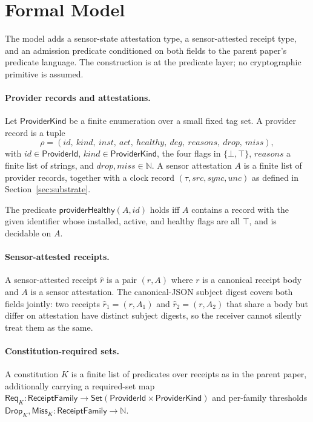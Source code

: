 \section{Formal Model}
\label{sec:model}

The model adds a sensor-state attestation type, a sensor-attested receipt type, and an admission predicate conditioned on both fields to the parent paper's predicate language. The construction is at the predicate layer; no cryptographic primitive is assumed.

\paragraph{Provider records and attestations.}
Let $\mathsf{ProviderKind}$ be a finite enumeration over a small fixed tag set. A provider record is a tuple
\[
  \rho = (\mathit{id},\ \mathit{kind},\ \mathit{inst},\ \mathit{act},\ \mathit{healthy},\ \mathit{deg},\ \mathit{reasons},\ \mathit{drop},\ \mathit{miss}),
\]
with $\mathit{id} \in \mathsf{ProviderId}$, $\mathit{kind} \in \mathsf{ProviderKind}$, the four flags in $\{\bot,\top\}$, $\mathit{reasons}$ a finite list of strings, and $\mathit{drop}, \mathit{miss} \in \mathbb{N}$. A sensor attestation $A$ is a finite list of provider records, together with a clock record $(\tau, \mathit{src}, \mathit{sync}, \mathit{unc})$ as defined in Section~\ref{sec:substrate}.

The predicate $\mathsf{providerHealthy}(A, \mathit{id})$ holds iff $A$ contains a record with the given identifier whose installed, active, and healthy flags are all $\top$, and is decidable on $A$.

\paragraph{Sensor-attested receipts.}
A sensor-attested receipt $\hat r$ is a pair $(r, A)$ where $r$ is a canonical receipt body and $A$ is a sensor attestation. The canonical-JSON subject digest covers both fields jointly: two receipts $\hat r_1 = (r, A_1)$ and $\hat r_2 = (r, A_2)$ that share a body but differ on attestation have distinct subject digests, so the receiver cannot silently treat them as the same.

\paragraph{Constitution-required sets.}
A constitution $K$ is a finite list of predicates over receipts as in the parent paper, additionally carrying a required-set map $\mathsf{Req}_K : \mathsf{ReceiptFamily} \to \mathsf{Set}(\mathsf{ProviderId} \times \mathsf{ProviderKind})$ and per-family thresholds $\mathsf{Drop}_K, \mathsf{Miss}_K : \mathsf{ReceiptFamily} \to \mathbb{N}$.

